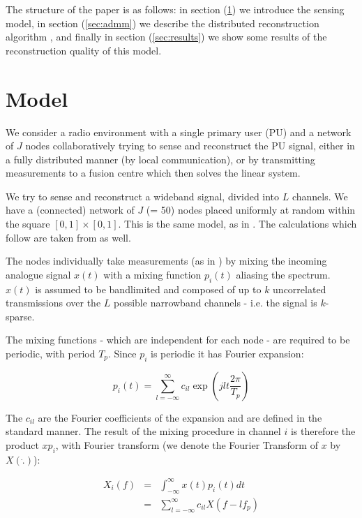 \documentclass{article}
\begin{document}
The structure of the paper is as follows: in section (\ref{sec:sensingmodel}) we introduce the sensing model, in section (\ref{sec:admm}) we describe the distributed reconstruction algorithm \cite{mota2013d}, and finally in section (\ref{sec:results}) we show some results of the reconstruction quality of this model. \cite{mishali2010theory} \cite{tropp2010beyond}

\section{Model}\label{sec:sensingmodel}

We consider a radio environment with a single primary user (PU) and a network of \(J\) nodes collaboratively trying to sense and reconstruct the PU signal, either in a fully distributed manner (by local communication), or by transmitting measurements to a fusion centre which then solves the linear system. 

We try to sense and reconstruct a wideband signal, divided into \(L\) channels. We have a (connected) network of \(J\) (= 50) nodes placed uniformly at random within the square \(  \left[0,1\right]\times \left[0,1\right] \). This is the same model, as in \cite{Zhang2011b}. The calculations which follow are taken from \cite{Zhang2011b} as well.

The nodes individually take measurements (as in \cite{mishali2010theory}) by mixing the incoming analogue signal \(x\left(t\right)\) with a mixing function \(p_i\left(t\right)\) aliasing the spectrum. \(x\left(t\right)\) is assumed to be bandlimited and composed of up to \(k\) uncorrelated transmissions over the \(L\) possible narrowband channels - i.e. the signal is \(k\)-sparse. 

The mixing functions - which are independent for each node - are required to be periodic, with period \(T_p\). Since \(p_i\) is periodic it has Fourier expansion:

\begin{equation}
p_i\left(t\right) = \sum_{l=-\infty}^{\infty} c_{il} \exp\left({jlt\frac{2\pi}{T_p}}\right)
\end{equation}

The \(c_{il}\) are the Fourier coefficients of the expansion and are defined in the standard manner. The result of the mixing procedure in channel \(i\) is therefore the product \(xp_i\), with Fourier transform (we denote the Fourier Transform of \(x\) by \(X\left( \dot{.} \right)\)):

\begin{align}
X_{i}\left(f\right) &=& \int_{-\infty}^{\infty} x\left(t\right) p_i\left(t\right) dt \nonumber
\\ &=& \sum_{l=-\infty}^{\infty} c_{il} X\left(f-lf_p\right)
\end{align}
\end{document}
